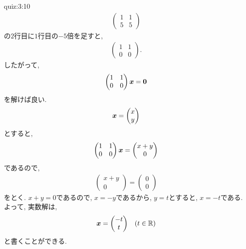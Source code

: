\begin{answerof}{quiz:3:10} 
  \begin{align*}
    \begin{pmatrix}1&1\\5&5\end{pmatrix}
  \end{align*}
  の$2$行目に$1$行目の$-5$倍を足すと,
 \begin{align*}
    \begin{pmatrix}1&1\\0&0\end{pmatrix}.
  \end{align*}
 したがって,
  \begin{align*}
    \begin{pmatrix}1&1\\0&0\end{pmatrix}
    \boldsymbol{x}=\boldsymbol{0}
  \end{align*}
  を解けば良い.
  \begin{align*}
    \boldsymbol{x}=
    \begin{pmatrix}x\\y\end{pmatrix}
  \end{align*}
  とすると,
  \begin{align*}
    \begin{pmatrix}1&1\\0&0\end{pmatrix}
      \boldsymbol{x}
      =
    \begin{pmatrix}x+y\\0\end{pmatrix}
  \end{align*}
  であるので,
  \begin{align*}
    \begin{pmatrix}x+y\\0\end{pmatrix}=
      \begin{pmatrix}0\\0\end{pmatrix}
  \end{align*}
  をとく. $x+y=0$であるので,
  $x=-y$であるから,
  $y=t$とすると, $x=-t$である.
  よって, 実数解は,
  \begin{align*}
    \boldsymbol{x}=\begin{pmatrix}-t\\t\end{pmatrix} && (t\in\mathbb{R})
  \end{align*}
  と書くことができる.  
\end{answerof}
